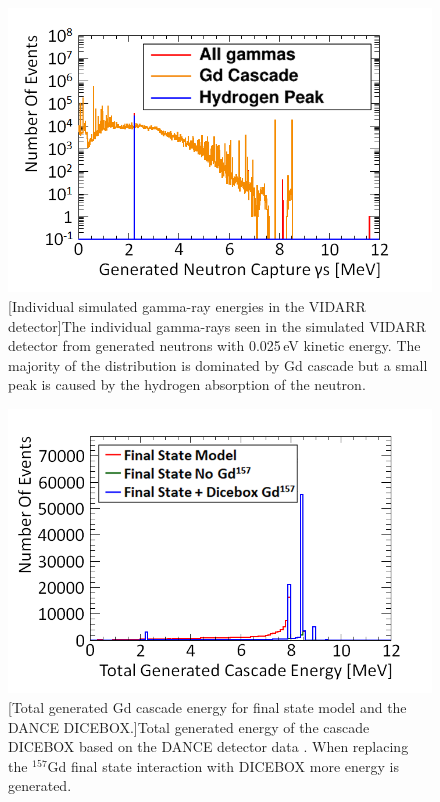 \begin{figure}[!h]
\centering
\begin{minipage}{.45\textwidth}
  \centering
  \includegraphics[width=\linewidth]{Chapter4/Figs/Raster/gadolinium/gdCascadeVsAllGammasMedText.png}
  [Individual simulated gamma-ray energies in the VIDARR detector]{The individual gamma-rays seen in the simulated VIDARR detector from generated neutrons with 0.025\,eV kinetic energy. The majority of the distribution is dominated by Gd cascade but a small peak is caused by the hydrogen absorption of the neutron.} 
  \label{fig:gdCascadeVsAllGammas}
\end{minipage}%
\qquad
\begin{minipage}{.45\textwidth}
  \centering
  \includegraphics[width=\linewidth]{Chapter4/Figs/Raster/finalStateAndDiceBoxBarsGeneratedEnergyMedText.png} 
  [Total generated Gd cascade energy for final state model and the DANCE DICEBOX.]{Total generated energy of the cascade DICEBOX based on the DANCE detector data \cite{Chyzh_2011}. When replacing the $^{157}$Gd final state interaction with DICEBOX more energy is generated.}
  \label{fig:TotalGeneratedEnergyOfCascadeFinalStateDicebox}
  \vspace{0.478cm} %
\end{minipage}
\end{figure}

